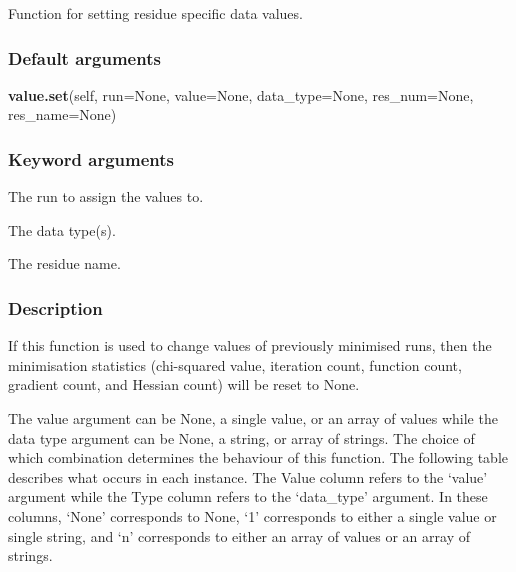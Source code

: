 Function for setting residue specific data values.

\subsubsection{Default arguments}

\textsf{\textbf{value.set}(self, run=None, value=None, data\_type=None, res\_num=None, res\_name=None)}


\subsubsection{Keyword arguments}

  The run to assign the values to.

  The data type(s).

  The residue name.

\subsubsection{Description}

If this function is used to change values of previously minimised runs, then the
minimisation statistics (chi-squared value, iteration count, function count, gradient count,
and Hessian count) will be reset to None.


The value argument can be None, a single value, or an array of values while the data type
argument can be None, a string, or array of strings.  The choice of which combination
determines the behaviour of this function.  The following table describes what occurs in
each instance.  The Value column refers to the `value' argument while the Type column refers
to the `data\_type' argument.  In these columns, `None' corresponds to None, `1' corresponds
to either a single value or single string, and `n' corresponds to either an array of values
or an array of strings.



